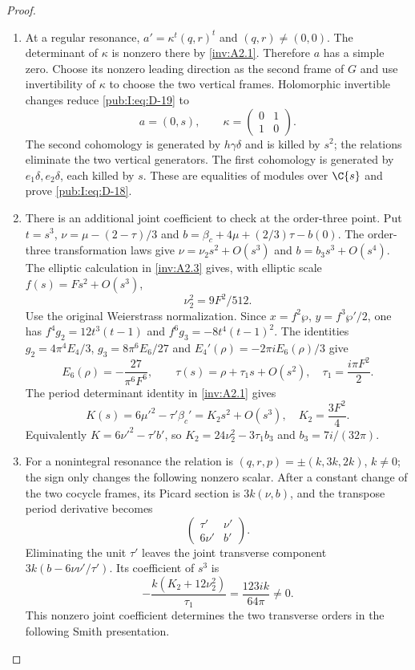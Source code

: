 \begin{proof}
\begin{enumerate}[label=\arabic*.,leftmargin=*]
\item At a regular resonance, $a'=\kappa^t(q,r)^t$ and
$(q,r)\ne(0,0)$. The determinant of $\kappa$ is nonzero there by
\cref{inv:A2.1}. Therefore $a$ has a simple zero. Choose its nonzero leading
direction as the second frame of $G$ and use invertibility of
$\kappa$ to choose the two vertical frames. Holomorphic invertible
changes reduce \eqref{pub:I:eq:D-19} to
\begin{equation}
 a=(0,s),\qquad \kappa=\begin{pmatrix}0&1\\1&0\end{pmatrix}.
\label{pub:I:eq:D-21}
\end{equation}
The second cohomology is generated by $h\gamma\delta$ and is killed
by $s^2$; the relations eliminate the two vertical generators.
The first cohomology is generated by $e_1\delta,e_2\delta$, each
killed by $s$. These are equalities of modules over $\C\{s\}$
and prove \eqref{pub:I:eq:D-18}.

\item There is an additional joint coefficient to check at the order-three
point. Put $t=s^3$, $\nu=\mu-(2-\tau)/3$ and
$b=\beta_c+4\mu+(2/3)\tau-b(0)$. The order-three transformation
laws give $\nu=\nu_2s^2+O(s^3)$ and $b=b_3s^3+O(s^4)$.
The elliptic calculation in \ref{inv:A2.3} gives, with elliptic scale
$f(s)=F s^2+O(s^3)$,
\[
 \nu_2^2=9F^2/512.
\]
Use the original Weierstrass normalization. Since $x=f^2\wp$,
$y=f^3\wp'/2$, one has
$f^4g_2=12t^3(t-1)$ and $f^6g_3=-8t^4(t-1)^2$.
The identities $g_2=4\pi^4E_4/3$, $g_3=8\pi^6E_6/27$ and
$E_4'(\rho)=-2\pi iE_6(\rho)/3$ give
\[
 E_6(\rho)=-\frac{27}{\pi^6F^6},\qquad
 \tau(s)=\rho+\tau_1s+O(s^2),\quad \tau_1=\frac{i\pi F^2}{2}.
\]
The period determinant identity in \cref{inv:A2.1} gives
\[
 K(s)=6\mu'^2-\tau'\beta_c'=K_2s^2+O(s^3),
 \quad K_2=\frac{3F^2}{4}.
\]
Equivalently $K=6\nu'^2-\tau'b'$, so
$K_2=24\nu_2^2-3\tau_1b_3$ and $b_3=7i/(32\pi)$.

\item For a nonintegral resonance the relation is
$(q,r,p)=\pm(k,3k,2k)$, $k\ne0$; the sign only changes the
following nonzero scalar. After a constant change of the two
cocycle frames, its Picard section is $3k(\nu,b)$, and the
transpose period derivative becomes
\[
 \begin{pmatrix}\tau'&\nu'\\6\nu'&b'\end{pmatrix}.
\]
Eliminating the unit $\tau'$ leaves the joint transverse component
$3k(b-6\nu\nu'/\tau')$. Its coefficient of $s^3$ is
\begin{equation}
 -\frac{k(K_2+12\nu_2^2)}{\tau_1}
       =\frac{123ik}{64\pi}\ne0.
\label{pub:I:eq:D-22}
\end{equation}
This nonzero joint coefficient determines the two transverse
orders in the following Smith presentation.


\end{enumerate}
\end{proof}
